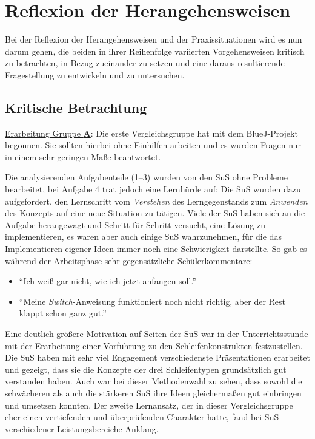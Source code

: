 \documentclass[paper=a4, DIV=13, BCOR=8mm, oneside=on, onecolumn=on, open = any, titlepage =on, parskip =half-, headsepline = on, footsepline = off, chapterprefix = on, sectionprefix = on, appendixprefix = off, fontsize = 12pt, numbers = noenddot, abstract = off]{scrreprt}
\begin{document}
\par \singlespacing
\chapter{Reflexion der Herangehensweisen}
\onehalfspacing
\vspace*{-1cm}
 Bei der Reflexion der Herangehensweisen und der Praxissituationen wird es nun darum gehen, die beiden in ihrer Reihenfolge variierten Vorgehensweisen kritisch zu betrachten, in Bezug zueinander zu setzen und eine daraus resultierende Fragestellung zu entwickeln und zu untersuchen.

\par \singlespacing
\section{Kritische Betrachtung}
\label{kritische betrachtung}
\onehalfspacing

\underline{Erarbeitung Gruppe \textsc{\textbf{A}}}: Die erste Vergleichsgruppe hat mit dem BlueJ-Projekt begonnen. Sie sollten hierbei ohne Einhilfen arbeiten und es wurden Fragen nur in einem sehr geringen Maße beantwortet. 

Die analysierenden Aufgabenteile (1--3) wurden von den SuS ohne Probleme bearbeitet, bei Aufgabe 4 trat jedoch eine Lernhürde auf: Die SuS wurden dazu aufgefordert, den Lernschritt vom \emph{Verstehen} des Lerngegenstands zum \emph{Anwenden} des Konzepts auf eine neue Situation zu tätigen. Viele der SuS haben sich an die Aufgabe herangewagt und Schritt für Schritt versucht, eine Lösung zu implementieren, es waren aber auch einige SuS wahrzunehmen, für die das Implementieren eigener Ideen immer noch eine Schwierigkeit darstellte. So gab es während der Arbeitsphase sehr gegensätzliche Schülerkommentare:

\singlespacing
\begin{itemize}
\item "`Ich weiß gar nicht, wie ich jetzt anfangen soll."'
\item "`Meine \emph{Switch}-Anweisung funktioniert noch nicht richtig, aber der Rest klappt schon ganz gut."'
\end{itemize}
\onehalfspacing

Eine deutlich größere Motivation auf Seiten der SuS war in der Unterrichtsstunde mit der Erarbeitung einer Vorführung zu den Schleifenkonstrukten festzustellen. Die SuS haben mit sehr viel Engagement verschiedenste Präsentationen erarbeitet und gezeigt, dass sie die Konzepte der drei Schleifentypen grundsätzlich gut verstanden haben. Auch war bei dieser Methodenwahl zu sehen, dass sowohl die schwächeren als auch die stärkeren SuS ihre Ideen gleichermaßen gut einbringen und umsetzen konnten.
Der zweite Lernansatz, der in dieser Vergleichsgruppe eher einen vertiefenden und überprüfenden Charakter hatte, fand bei SuS verschiedener Leistungsbereiche Anklang.
\end{document}
